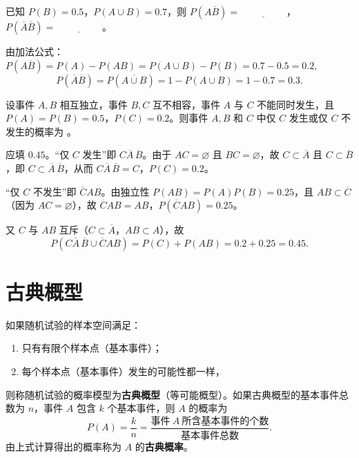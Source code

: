 \documentclass[lang=cn,11pt]{elegantbook}
\begin{document}
\begin{exercise}\label{exer:1-45}
已知 \(P(B)=0.5\)，\(P(A\cup B)=0.7\)，则 \(P(A\overline{B})=\underline{\hspace{2cm}}\)，\(P(\overline{A}\overline{B})=\underline{\hspace{2cm}}\)。
\end{exercise}

\begin{solution}
由加法公式：
\(
P(A\overline{B}) = P(A) - P(AB) = P(A\cup B) - P(B) = 0.7 - 0.5 = 0.2,
\)
\[
P(\overline{A}\overline{B}) = P(\overline{A\cup B}) = 1 - P(A\cup B) = 1 - 0.7 = 0.3.
\]
\end{solution}

\begin{exercise}[提高]\label{exer:1-49}
设事件 \(A,B\) 相互独立，事件 \(B,C\) 互不相容，事件 \(A\) 与 \(C\) 不能同时发生，且 \(P(A)=P(B)=0.5\)，\(P(C)=0.2\)。则事件 \(A,B\) 和 \(C\) 中仅 \(C\) 发生或仅 \(C\) 不发生的概率为 \underline{\hspace{2cm}}。
\end{exercise}

\begin{solution}
应填 \(0.45\)。“仅 \(C\) 发生”即 \(C\overline{A}\,\overline{B}\)。由于 \(AC=\varnothing\) 且 \(BC=\varnothing\)，故 \(C\subset\overline{A}\) 且 \(C\subset\overline{B}\)，即 \(C\subset\overline{A}\,\overline{B}\)，从而 \(C\overline{A}\,\overline{B}=C\)，\(P(C)=0.2\)。

“仅 \(C\) 不发生”即 \(\overline{C}AB\)。由独立性 \(P(AB)=P(A)P(B)=0.25\)，且 \(AB\subset\overline{C}\)（因为 \(AC=\varnothing\)），故 \(\overline{C}AB=AB\)，\(P(\overline{C}AB)=0.25\)。

又 \(C\) 与 \(AB\) 互斥（\(C\subset\overline{A}\)，\(AB\subset A\)），故
\[
P(C\overline{A}\,\overline{B}\cup\overline{C}AB) = P(C)+P(AB) = 0.2+0.25 = 0.45.
\]
\end{solution}


\section{古典概型}

\begin{definition}[古典概型] \label{def:classical-prob}
如果随机试验的样本空间满足：
\begin{enumerate}
    \item 只有有限个样本点（基本事件）；
    \item 每个样本点（基本事件）发生的可能性都一样，
\end{enumerate}
则称随机试验的概率模型为\textbf{古典概型}（等可能概型）。如果古典概型的基本事件总数为 \(n\)，事件 \(A\) 包含 \(k\) 个基本事件，则 \(A\) 的概率为
\[
P(A) = \frac{k}{n} = \frac{\text{事件} \ A \ \text{所含基本事件的个数}}{\text{基本事件总数}}.
\]
由上式计算得出的概率称为 \(A\) 的\textbf{古典概率}。
\end{definition}
\end{document}
